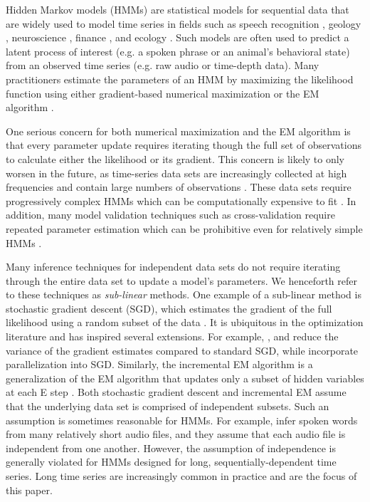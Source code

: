 Hidden Markov models (HMMs) are statistical models for sequential data that are widely used to model time series in fields such as speech recognition \citep{Gales:2008}, geology \citep{Bebbington:2007}, neuroscience \citep{Kottaram:2019}, finance \citep{Mamon:2007}, and ecology \citep{McClintock:2020}. Such models are often used to predict a latent process of interest (e.g. a spoken phrase or an animal's behavioral state) from an observed time series (e.g. raw audio or time-depth data). Many practitioners estimate the parameters of an HMM by maximizing the likelihood function using either gradient-based numerical maximization or the EM algorithm \citep{Baum:1970,Dempster:1977}.

One serious concern for both numerical maximization and the EM algorithm is that every parameter update requires iterating though the full set of observations to calculate either the likelihood or its gradient. This concern is likely to only worsen in the future, as time-series data sets are increasingly collected at high frequencies and contain large numbers of observations \citep{Patterson:2017,Li:2020}. These data sets require progressively complex HMMs which can be computationally expensive to fit \citep{Adam:2019,Sidrow:2021}. In addition, many model validation techniques such as cross-validation require repeated parameter estimation which can be prohibitive even for relatively simple HMMs \citep{Pohle:2017}.

Many inference techniques for independent data sets do not require iterating through the entire data set to update a model’s parameters. We henceforth refer to these techniques as \textit{sub-linear} methods. One example of a sub-linear method is stochastic gradient descent (SGD), which estimates the gradient of the full likelihood using a random subset of the data \citep{Robbins:1951}. It is ubiquitous in the optimization literature and has inspired several extensions. For example, \citet{Johnson:2013}, \citet{Defazio:2014} and \citet{Kingma:2014} reduce the variance of the gradient estimates compared to standard SGD, while \citet{Zinkevich:2010} incorporate parallelization into SGD.
%
Similarly, the incremental EM algorithm is a generalization of the EM algorithm that updates only a subset of hidden variables at each E step \citep{Neal:1998, Thiesson:2001, Karimi:2019}. 
%
Both stochastic gradient descent and incremental EM assume that the underlying data set is comprised of independent subsets. Such an assumption is sometimes reasonable for HMMs. For example, \citet{Gales:2008} infer spoken words from many relatively short audio files, and they assume that each audio file is independent from one another. However, the assumption of independence is generally violated for HMMs designed for long, sequentially-dependent time series. Long time series are increasingly common in practice and are the focus of this paper. 

